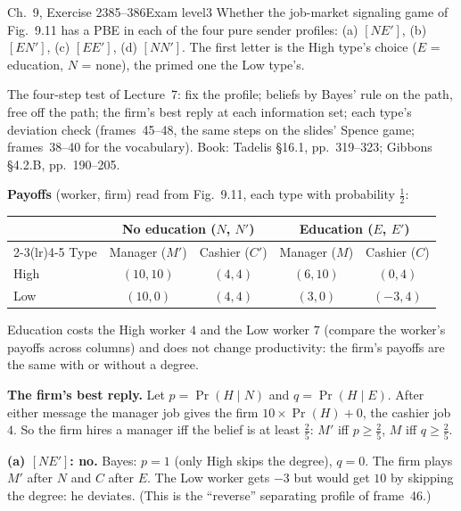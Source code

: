 \begin{exsol}{\MG{} Ch.~9, Exercise 2}{385--386}{Exam level}{3}
\asked Whether the job-market signaling game of Fig.~9.11 has a PBE in each of the four pure sender
profiles: (a) $[NE']$, (b) $[EN']$, (c) $[EE']$, (d) $[NN']$. The first letter is the High type's choice
($E$ = education, $N$ = none), the primed one the Low type's.

\method The four-step test of Lecture~7: fix the profile; beliefs by Bayes' rule on the path, free off the
path; the firm's best reply at each information set; each type's deviation check (frames~45--48, the same
steps on the slides' Spence game; frames~38--40 for the vocabulary). Book: Tadelis \S16.1, pp.~319--323;
Gibbons \S4.2.B, pp.~190--205.

\solution
\textbf{Payoffs} (worker, firm) read from Fig.~9.11, each type with probability $\frac12$:
\begin{center}
\begin{tabular}{lcccc}
\toprule
& \multicolumn{2}{c}{No education ($N$, $N'$)} & \multicolumn{2}{c}{Education ($E$, $E'$)} \\
\cmidrule(lr){2-3}\cmidrule(lr){4-5}
Type & Manager ($M'$) & Cashier ($C'$) & Manager ($M$) & Cashier ($C$) \\
\midrule
High & $(10, 10)$ & $(4, 4)$ & $(6, 10)$ & $(0, 4)$ \\
Low & $(10, 0)$ & $(4, 4)$ & $(3, 0)$ & $(-3, 4)$ \\
\bottomrule
\end{tabular}
\end{center}
Education costs the High worker $4$ and the Low worker $7$ (compare the worker's payoffs across columns)
and does not change productivity: the firm's payoffs are the same with or without a degree.

\textbf{The firm's best reply.} Let $p = \Pr(H \mid N)$ and $q = \Pr(H \mid E)$. After either message the
manager job gives the firm $10 \times \Pr(H) + 0$, the cashier job $4$. So the firm hires a manager iff the
belief is at least $\frac25$: $M'$ iff $p \ge \frac25$, $M$ iff $q \ge \frac25$.

\textbf{(a) $[NE']$: no.} Bayes: $p = 1$ (only High skips the degree), $q = 0$. The firm plays $M'$ after
$N$ and $C$ after $E$. The Low worker gets $-3$ but would get $10$ by skipping the degree: he deviates.
(This is the ``reverse'' separating profile of frame~46.)


\end{exsol}
